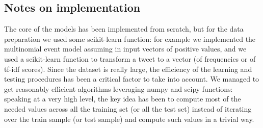 \subsection*{Notes on implementation}
The core of the models has been implemented from scratch, but for the data preparation we used some scikit-learn function: for example we implemented the multinomial event model assuming in input vectors of positive values, and we used a scikit-learn function to transform a tweet to a vector (of frequencies or of tf-idf scores). Since the dataset is really large, the efficiency of the learning and testing procedures has been a critical factor to take into account. We managed to get reasonably efficient algorithms leveraging numpy and scipy functions: speaking at a very high level, the key idea has been to compute most of the needed values across all the training set (or all the test set) instead of iterating over the train sample (or test sample) and compute such values in a trivial way.
